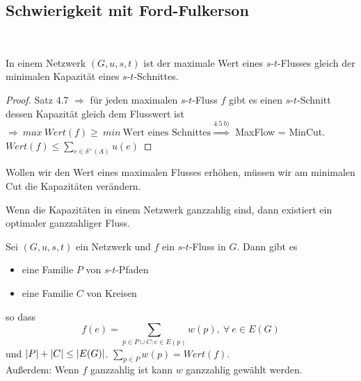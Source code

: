 \subsection{Schwierigkeit mit Ford-Fulkerson}
\begin{beispiel}~\\
	\begin{center}
	\end{center}
\end{beispiel}
\begin{satz}
	In einem Netzwerk $(G, u, s, t)$ ist der maximale Wert eines $s$-$t$-Flusses gleich der minimalen Kapazität eines $s$-$t$-Schnittes.
\end{satz}
\begin{proof}
	Satz 4.7 $\Rightarrow$ für jeden maximalen $s$-$t$-Fluss $f$ gibt es einen $s$-$t$-Schnitt dessen Kapazität gleich dem Flusswert ist $\Rightarrow~max~Wert(f) \ge~min~\text{Wert eines Schnittes} \overset{4.5~b)}{\Rightarrow}$ MaxFlow = MinCut. $Wert(f) \le \sum_{e\in \delta^+(A)}u(e)$
\end{proof}
\begin{beobachtung}
	Wollen wir den Wert eines maximalen Flusses erhöhen, müssen wir am minimalen Cut die Kapazitäten verändern.
\end{beobachtung}
\begin{korollar}
	Wenn die Kapazitäten in einem Netzwerk ganzzahlig sind, dann existiert ein optimaler ganzzahliger Fluss.
\end{korollar}
\begin{satz}
	Sei $(G, u, s, t)$ ein Netzwerk und $f$ ein $s$-$t$-Fluss in $G$. Dann gibt es
	\begin{itemize}
		\item eine Familie $P$ von $s$-$t$-Pfaden
		\item eine Familie $C$ von Kreisen
	\end{itemize}
	so dass \[f(e) = \sum_{p\in P \cup C: e \in E(p)}w(p), ~\forall~e\in E(G)\] und $\vert P \vert + \vert C \vert\le \vert E(G) \vert$. $\sum_{p\in P} w(p) = Wert(f)$. \\[5pt]
	Außerdem: Wenn $f$ ganzzahlig ist kann $w$ ganzzahlig gewählt werden.
\end{satz}
